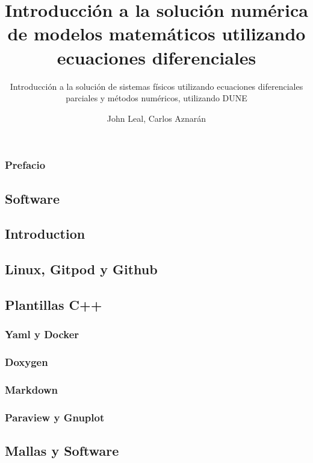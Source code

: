 \documentclass[10pt,
	a4paper,
	spanish,
	titlepage=firstiscover,
	titlepage=true,
	BCOR=2cm,
	DIV=12
]{scrbook}
\author{John Leal, Carlos Aznarán}
\title{Introducción a la solución numérica de modelos matemáticos utilizando ecuaciones 
	diferenciales}
\subtitle{Introducción a la solución de sistemas físicos utilizando ecuaciones diferenciales 
	parciales y métodos numéricos, utilizando DUNE}
\begin{document}
\extratitle{}

\maketitle

\section*{Prefacio}

\tableofcontents

\begin{refsection}
	\part{Software} %
	\chapter{Introduction}
	\chapter{Linux, Gitpod y Github}
	\chapter{Plantillas C++}
	\section{Yaml y Docker}
	\section{Doxygen}
	\section{Markdown}
	\section{Paraview y Gnuplot}
	\chapter{Mallas y Software}
	

\end{refsection}
\end{document}
